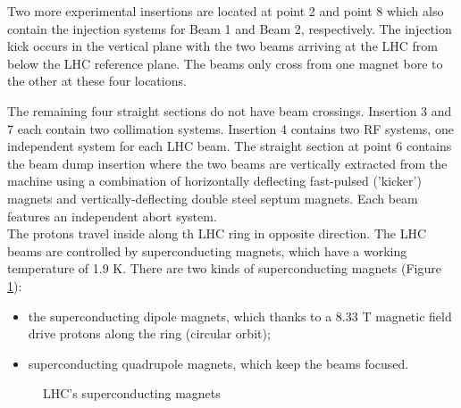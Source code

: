 \documentclass[a4paper, oneside, 11pt, openright]{book}
\begin{document}
					Two more experimental insertions are located at point 2 and point 8 which also contain the injection systems for Beam
					1 and Beam 2, respectively. The injection kick occurs in the vertical plane with the two beams arriving at the LHC from below the LHC reference plane. The beams only cross from one magnet bore to the other at
					these four locations.
					
					The remaining four straight sections do not have beam crossings. Insertion 3 and 7 each contain two collimation systems. Insertion 4 contains two RF systems, one independent system for each LHC
					beam. The straight section at point 6 contains the beam dump insertion where the two beams are vertically
					extracted from the machine using a combination of horizontally deflecting fast-pulsed ('kicker') magnets and
					vertically-deflecting double steel septum magnets. Each beam features an independent abort system. \cite{LHC design} \\
					The protons travel inside along th LHC ring in opposite direction. The LHC beams are controlled by superconducting magnets, which have a working temperature of 1.9 K. There are two kinds of superconducting magnets (Figure \ref{fig:magnets}):
					\begin{itemize}
						\item the superconducting dipole magnets, which thanks to a 8.33 T magnetic field drive protons along the ring (circular orbit);
						\item superconducting quadrupole magnets, which keep the beams focused.
					\end{itemize} 
					\begin{figure}
						\centering
						 \quad
						\caption{LHC's superconducting magnets}
						\label{fig:magnets}
					\end{figure}
\end{document}
